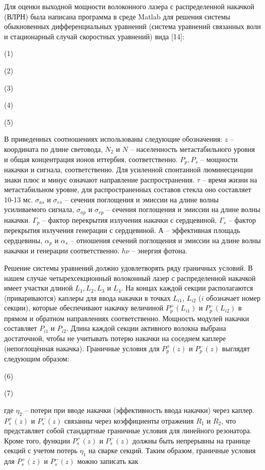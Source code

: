 Для оценки выходной мощности волоконного лазера с распределенной накачкой (ВЛРН) была написана программа в среде Matlab для решения системы обыкновенных дифференциальных уравнений (система уравнений связанных волн и стационарный случай скоростных уравнений) вида [14]:

(1)

(2)

(3)

(4)

(5)

В приведенных соотношениях использованы следующие обозначения: $z$ – координата по длине световода, $N_2$ и $N$ -- населенность метастабильного уровня и общая концентрация ионов иттербия, соответственно. $P_p, P_s$ -- мощности накачки и сигнала, соответственно. Для усиленной спонтанной люминесценции знаки плюс и минус означают направление распространения. $\tau$ -- время жизни на метастабильном уровне, для распространенных составов стекла оно составляет 10-13 мс. $\sigma_{as}$ и $\sigma_{es}$ -- сечения поглощения и эмиссии на длине волны усиливаемого сигнала, $\sigma_{ap}$ и $\sigma_{ep}$ -- сечения поглощения и эмиссии на длине волны накачки. $\Gamma_p$ -- фактор перекрытия излучения накачки с сердцевиной, $\Gamma_s$ -- фактор перекрытия излучения генерации с сердцевиной. $А$ -- эффективная площадь сердцевины, $\alpha_p$ и $\alpha_s$ -- отношения сечений поглощения и эмиссии на длине волны накачки и генерации соответственно. $h\nu$ -- энергия фотона.

Решение системы уравнений должно удовлетворять ряду граничных условий. В нашем случае четырехсекционный волоконный лазер с распределенной накачкой имеет участки длиной $L_1, L_2, L_3$ и $L_4$. На концах каждой секции располагаются (привариваются) каплеры для ввода накачки в точках $L_{i1}$, $L_{i2}$ ($i$ обозначает номер секции), которые обеспечивают накачку величиной $P^+_p(L_{i1})$ и $P_{p}^{-}(L_{i2})$ в прямом и обратном направлениях соответственно. Мощность модулей накачки составляет $P_{i1}$ и $P_{i2}$. Длина каждой секции активного волокна выбрана достаточной, чтобы не учитывать потерю накачки на соседнем каплере (непоглощённая накачка). Граничные условия для $P_{p}^{+}(z)$ и $P_{p}^{-}(z)$ выглядят следующим образом:

(6)

(7)

где $\eta_2$ -- потери при вводе накачки (эффективность ввода накачки) через каплер. $P_s^{+}(z)$ и $P_s^{-}(z)$ связанны через коэффициенты отражения $R_1$ и $R_2$, что представляет собой стандартные граничные условия для линейного резонатора. Кроме того, функции $P_s^{+}(z)$ и $P_s^{-}(z)$ должны быть непрерывны на границе секций с учетом потерь $\eta_1$ на сварке секций. Таким образом, граничные условия для $P_s^{+}(z)$ и $P_s^{-}(z)$ можно записать как

